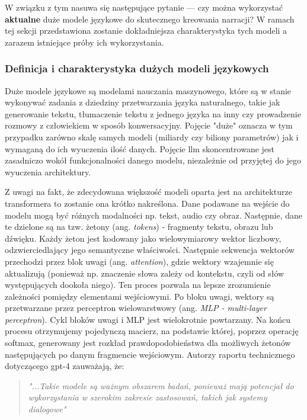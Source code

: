 W związku z tym nasuwa się następujące pytanie --- czy można wykorzystać \textbf{aktualne} duże modele
językowe do skutecznego kreowania narracji? W ramach tej sekcji przedstawiona zostanie dokładniejsza
charakterystyka tych modeli a zarazem istniejące próby ich wykorzystania.

\subsubsection*{Definicja i charakterystyka dużych modeli językowych}

Duże modele językowe są modelami nauczania maszynowego, które są w stanie wykonywać zadania z dziedziny
przetwarzania języka naturalnego, takie jak generowanie tekstu, tłumaczenie tekstu z jednego języka
na inny czy prowadzenie rozmowy z człowiekiem w sposób konwersacyjny\cite{larp_language}. Pojęcie
"duże" oznacza w tym przypadku zarówno skalę samych modeli (miliardy czy biliony parametrów) jak i
wymaganą do ich wyuczenia ilość danych. Pojęcie \gls{llm} skoncentrowane jest zasadniczo wokół funkcjonalności
danego modelu, niezależnie od przyjętej do jego wyuczenia architektury.

Z uwagi na fakt, że zdecydowana większość modeli oparta jest na architekturze transformera to zostanie
ona krótko nakreślona. Dane podawane na wejście do modelu mogą być różnych modalności np. tekst,
audio czy obraz. Następnie, dane te dzielone są na tzw. żetony (ang. \textit{tokens}) - fragmenty tekstu,
obrazu lub dźwięku. Każdy żeton jest kodowany jako wielowymiarowy wektor liczbowy, odzwierciedlający
jego semantyczne właściwości. Następnie sekwencja wektorów przechodzi przez blok uwagi (ang.
\textit{attention}), gdzie wektory wzajemnie się aktualizują (ponieważ np. znaczenie słowa zależy od
kontekstu, czyli od słów występujących dookoła niego). Ten proces pozwala na lepsze zrozumienie
zależności pomiędzy elementami wejściowymi. Po bloku uwagi, wektory są przetwarzane przez
perceptron wielowarstwowy (ang. \textit{MLP - multi-layer perceptron}). Cykl bloków uwagi i MLP jest
wielokrotnie powtarzany. Na końcu procesu otrzymujemy pojedynczą macierz, na podstawie której, poprzez
operację softmax, generowany jest rozkład prawdopodobieństwa dla możliwych żetonów następujących po
danym fragmencie wejściowym. Autorzy raportu technicznego dotyczącego \gls{gpt}-4 zauważają, że:

\begin{quote}
    \textit{"...Takie modele są ważnym obszarem badań, ponieważ mają potencjał do wykorzystania w szerokim
        zakresie zastosowań, takich jak systemy dialogowe"}\cite{openai2024gpt4}
\end{quote}

